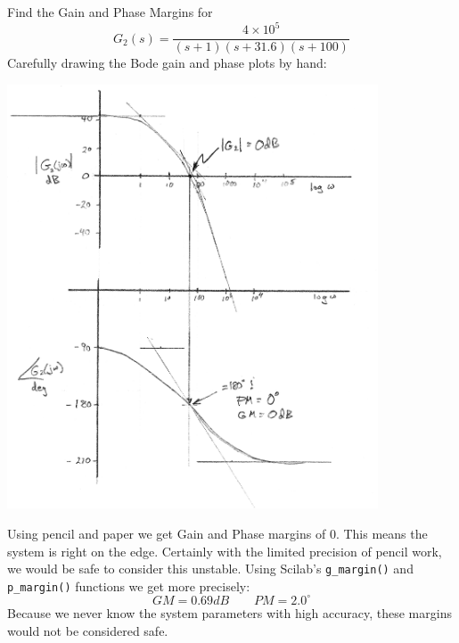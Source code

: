 \begin{ExampleSmall}
Find the Gain and Phase Margins for
\[
G_2(s) = \frac  {4\times10^5}  {(s+1)(s+31.6)(s+100)}
\]
Carefully drawing the Bode gain and phase plots by hand: 

\includegraphics[width=110mm]{figs06/01063.png}

Using pencil and paper we get Gain and Phase margins of 0.  This means the system is right on the edge.  Certainly with
the limited precision of pencil work, we would be safe to consider this unstable.   Using Scilab's {\tt g\_margin()} and 
{\tt p\_margin()} functions we get more precisely:
\[
GM = 0.69dB \qquad PM = 2.0^\circ
\]
Because we never know the system parameters with high accuracy, these margins would not be considered safe. 
\end{ExampleSmall}

























